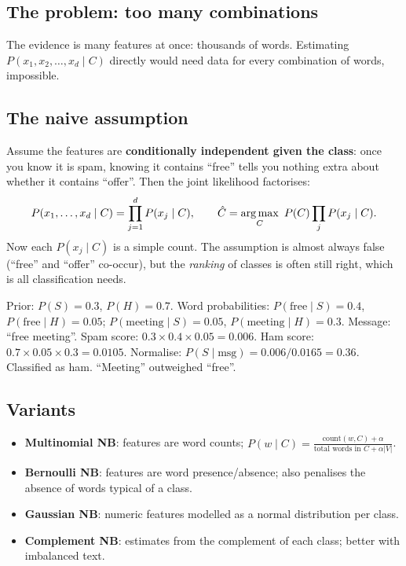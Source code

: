 \subsection{The problem: too many combinations}
The evidence is many features at once: thousands of words. Estimating $P(x_1, x_2, \dots, x_d\mid C)$ directly would need
data for every combination of words, impossible.

\subsection{The naive assumption}
Assume the features are \textbf{conditionally independent given the class}: once you know it is spam, knowing it contains
``free'' tells you nothing extra about whether it contains ``offer''. Then the joint likelihood factorises:
\[ P(x_1,\dots,x_d\mid C) = \prod_{j=1}^dP(x_j\mid C), \qquad \hat C = \operatorname*{arg\,max}_C\ P(C)\prod_jP(x_j\mid C). \]
Now each $P(x_j\mid C)$ is a simple count. The assumption is almost always false (``free'' and ``offer'' co-occur), but the
\emph{ranking} of classes is often still right, which is all classification needs.

\begin{example}
Prior: $P(S) = 0.3$, $P(H) = 0.7$. Word probabilities: $P(\text{free}\mid S) = 0.4$, $P(\text{free}\mid H) = 0.05$;
$P(\text{meeting}\mid S) = 0.05$, $P(\text{meeting}\mid H) = 0.3$. Message: ``free meeting''.
Spam score: $0.3\times0.4\times0.05 = 0.006$. Ham score: $0.7\times0.05\times0.3 = 0.0105$.
Normalise: $P(S\mid\text{msg}) = 0.006/0.0165 = 0.36$. Classified as ham. ``Meeting'' outweighed ``free''.
\end{example}

\subsection{Variants}
\begin{itemize}
\item \textbf{Multinomial NB}: features are word counts; $P(w\mid C) = \frac{\text{count}(w, C) + \alpha}{\text{total words in }C + \alpha|V|}$.
\item \textbf{Bernoulli NB}: features are word presence/absence; also penalises the absence of words typical of a class.
\item \textbf{Gaussian NB}: numeric features modelled as a normal distribution per class.
\item \textbf{Complement NB}: estimates from the complement of each class; better with imbalanced text.
\end{itemize}

